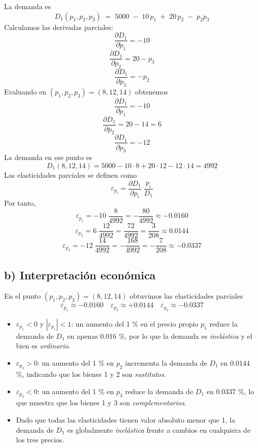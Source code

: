 \documentclass{article}
\begin{document}
La demanda es
\[
D_{1}(p_{1},p_{2},p_{3}) \;=\; 5000 \;-\;10\,p_{1}\;+\;20\,p_{2}\;-\;p_{2}p_{3}
\]
Calculamos las derivadas parciales:
\[
\frac{\partial D_{1}}{\partial p_{1}}
=-10
\]
\[
\frac{\partial D_{1}}{\partial p_{2}}
=20 - p_{3}
\]
\[
\frac{\partial D_{1}}{\partial p_{3}}
=-p_{2}
\]
Evaluando en \((p_{1},p_{2},p_{3})=(8,12,14)\) obtenemos
\[
\frac{\partial D_{1}}{\partial p_{1}}=-10
\]
\[
\frac{\partial D_{1}}{\partial p_{2}}=20-14=6
\]
\[
\frac{\partial D_{1}}{\partial p_{3}}=-12
\]
La demanda en ese punto es
\[
D_{1}(8,12,14)
=5000-10\cdot8+20\cdot12-12\cdot14
=4992
\]
Las elasticidades parciales se definen como
\[
\varepsilon_{p_{i}}
=\frac{\partial D_{1}}{\partial p_{i}}\;\frac{p_{i}}{D_{1}}
\]
Por tanto,
{\color{teal}
\[
\varepsilon_{p_{1}}
=-10\;\frac{8}{4992}
=-\frac{80}{4992}\approx -0.0160
\]
}
{\color{teal}
\[
\varepsilon_{p_{2}}
=6\;\frac{12}{4992}
=\frac{72}{4992}=\frac{3}{208}\approx 0.0144
\]
}
{\color{teal}
\[
\varepsilon_{p_{3}}
=-12\;\frac{14}{4992}
=-\frac{168}{4992}=-\frac{7}{208}\approx -0.0337
\]
}

\subsection*{b) Interpretación económica}

En el punto \((p_{1},p_{2},p_{3})=(8,12,14)\) obtuvimos las elasticidades par­ciales
\[
\varepsilon_{p_{1}}\approx -0.0160\quad
\varepsilon_{p_{2}}\approx +0.0144\quad
\varepsilon_{p_{3}}\approx -0.0337
\]

\begin{itemize}
  \item \(\varepsilon_{p_{1}}<0\) y \(|\varepsilon_{p_{1}}|<1\):  
    un aumento del 1 \% en el precio propio \(p_{1}\) reduce la demanda de \(D_{1}\) en apenas 0.016 \%,  
    por lo que la demanda es {\color{teal}\emph{inelástica}} y el bien es {\color{teal}\emph{ordinario}}.

  \item \(\varepsilon_{p_{2}}>0\):  
    un aumento del 1 \% en \(p_{2}\) incrementa la demanda de \(D_{1}\) en 0.0144 \%,  
    indicando que los bienes 1 y 2 son {\color{teal}\emph{sustitutos}}.

  \item \(\varepsilon_{p_{3}}<0\):  
    un aumento del 1 \% en \(p_{3}\) reduce la demanda de \(D_{1}\) en 0.0337 \%,  
    lo que muestra que los bienes 1 y 3 son {\color{teal}\emph{complementarios}}.

  \item Dado que todas las elasticidades tienen valor absoluto menor que 1,  
    la demanda de \(D_{1}\) es globalmente {\color{teal}\emph{inelástica}} frente a cambios en cualquiera de los tres precios.
\end{itemize}
\end{document}
